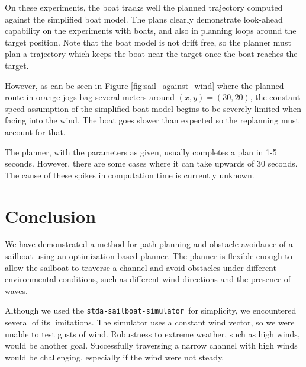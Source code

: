 \documentclass[conference]{IEEEtran}
\newcommand{\Sim}{\lstinline{stda-sailboat-simulator}\ }
\begin{document}
On these experiments, the boat tracks well the planned trajectory computed against the simplified boat model. The plans clearly demonstrate look-ahead capability on the experiments with boats, and also in planning loops around the target position. Note that the boat model is not drift free, so the planner must plan a trajectory which keeps the boat near the target once the boat reaches the target.

However, as can be seen in Figure \ref{fig:sail_against_wind} where the planned route in orange jogs bag several meters around \((x,y) = (30,20)\), the constant speed assumption of the simplified boat model begins to be severely limited when facing into the wind. The boat goes slower than expected so the replanning must account for that.  

The planner, with the parameters as given, usually completes a plan in 1-5 seconds. However, there are some cases where it can take upwards of 30 seconds. The cause of these spikes in computation time is currently unknown.


\section{Conclusion}
We have demonstrated a method for path planning and obstacle avoidance of a sailboat using an optimization-based planner. The planner is flexible enough to allow the sailboat to traverse a channel and avoid obstacles under different environmental conditions, such as different wind directions and the presence of waves.

Although we used the \Sim for simplicity, we encountered several of its limitations. The simulator uses a constant wind vector, so we were unable to test gusts of wind. Robustness to extreme weather, such as high winds, would be another goal. Successfully traversing a narrow channel with high winds would be challenging, especially if the wind were not steady.





\end{document}
